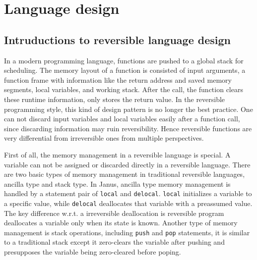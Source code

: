 \documentclass[aps,twocolumn,longbibliography,english,superscriptaddress]{revtex4-1}
\newcommand{\<}{\langle}
\renewcommand{\>}{\rangle}
\theoremstyle{definition}\newtheorem{definition}{\textit{Definition}}
\begin{document}
\section{Language design}\label{sec:lang}

\subsection{Intruductions to reversible language design}
    In a modern programming language, functions are pushed to a global stack for scheduling. The memory layout of a function is consisted of input arguments, a function frame with information like the return address and saved memory segments, local variables, and working stack. After the call, the function clears these runtime information, only stores the return value. In the reversible programming style, this kind of design pattern is no longer the best practice. One can not discard input variables and local variables easily after a function call, since discarding information may ruin reversibility. Hence reversible functions are very differential from irreversible ones from multiple perspectives.

    First of all, the memory management in a reversible language is special.
    A variable can not be assigned or discarded directly in a reversible language.
    There are two basic types of memory management in traditional reversible languages, ancilla type and stack type.
    In Janus, ancilla type memory management is handled by a statement pair of \texttt{local} and \texttt{delocal}.
    \texttt{local} initializes a variable to a specific value, while \texttt{delocal} deallocates that variable with a preassumed value.
    The key difference w.r.t. a irreversible deallocation is reversible program deallocates a variable only when its state is known.
    Another type of memory management is stack operations, including \texttt{push} and \texttt{pop} statements, it is similar to a traditional stack except it zero-clears the variable after pushing and presupposes the variable being zero-cleared before poping.
\end{document}
